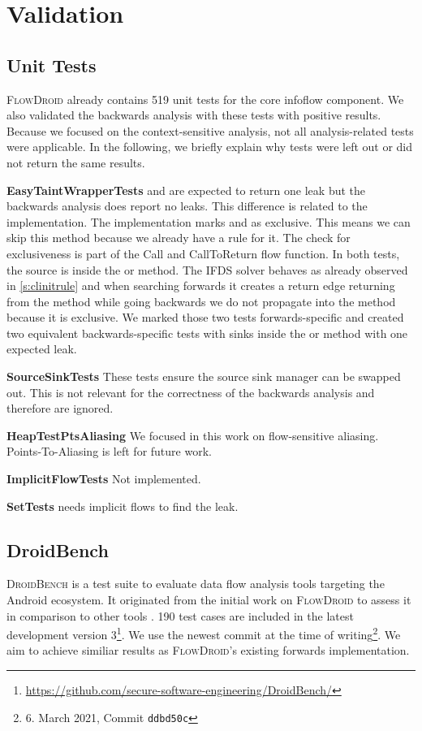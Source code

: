 \documentclass[../draft.tex]{subfiles}
\begin{document}
    \chapter{Validation}
    \section{Unit Tests}
    \textsc{FlowDroid} already contains 519 unit tests for the core infoflow component. We also validated the backwards analysis with these tests with positive results. Because we focused on the context-sensitive analysis, not all analysis-related tests were applicable. In the following, we briefly explain why tests were left out or did not return the same results.

    \textbf{EasyTaintWrapperTests}  and  are expected to return one leak but the backwards analysis does report no leaks. This difference is related to the  implementation. The implementation marks  and  as exclusive. This means we can skip this method because we already have a rule for it. The check for exclusiveness is part of the Call and CallToReturn flow function. In both tests, the source is inside the  or  method. The IFDS solver behaves as already observed in \autoref{s:clinitrule} and when searching forwards it creates a return edge returning from the method while going backwards we do not propagate into the method because it is exclusive.
    We marked those two tests forwards-specific and created two equivalent backwards-specific tests with sinks inside the  or  method with one expected leak.
    
    \textbf{SourceSinkTests} These tests ensure the source sink manager can be swapped out. This is not relevant for the correctness of the backwards analysis and therefore are ignored.

    \textbf{HeapTestPtsAliasing} We focused in this work on flow-sensitive aliasing. Points-To-Aliasing is left for future work.
    
    \textbf{ImplicitFlowTests} Not implemented. 

    \textbf{SetTests}  needs implicit flows to find the leak.

    \section{DroidBench}\label{s:droidbenchvalidation}
    \textsc{DroidBench} is a test suite to evaluate data flow analysis tools targeting the Android ecosystem. It originated from the initial work on \textsc{FlowDroid} to assess it in comparison to other tools \cite{Arzt2014}. 190 test cases are included in the latest development version 3\footnote{\url{https://github.com/secure-software-engineering/DroidBench/}}. We use the newest commit at the time of writing\footnote{6. March 2021, Commit \texttt{ddbd50c}}.
    We aim to achieve similiar results as \textsc{FlowDroid}'s existing forwards implementation.
    
\end{document}
